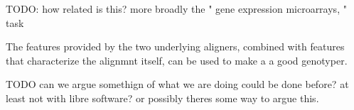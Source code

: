 \documentclass{article}
\begin{document}

TODO: how related is this? \cite{kirkpatrick2012bayesian} %
more broadly the " gene expression microarrays, " task %



The features provided by the two underlying aligners, combined with features that characterize the alignmnt itself, can be used to make a a good genotyper.




TODO can we argue somethign of what we are doing could be done before? at least not with libre software? or possibly theres some way to argue this.


\end{document}
